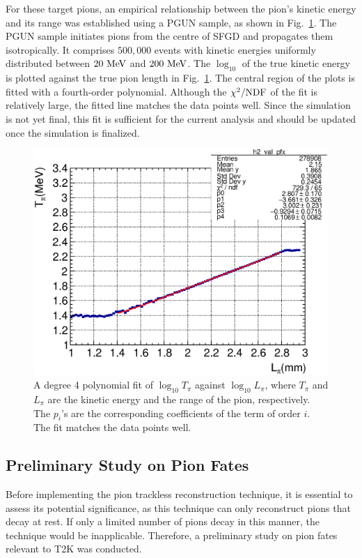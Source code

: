           For these target pions, an empirical relationship between the pion's kinetic energy and its range was established using a PGUN sample, as shown in Fig.~\ref{fig:pi-mombr-fit}. 
          The PGUN sample initiates pions from the centre of SFGD and propagates them isotropically. 
          It comprises $500,000$ events with kinetic energies uniformly distributed between $20~\textrm{MeV}$ and $200~\textrm{MeV}$. 
          The $\log_{10}$ of the true kinetic energy is plotted against the true pion length in Fig.~\ref{fig:pi-mombr-fit}.
          The central region of the plots is fitted with a fourth-order polynomial.
          Although the $\chi^2/{\textrm{NDF}}$ of the fit is relatively large, the fitted line matches the data points well.
          Since the simulation is not yet final, this fit is sufficient for the current analysis and should be updated once the simulation is finalized.
          \begin{figure}[ht]
          \centering
          \includegraphics[width=\sgfidwid\textwidth]{figures/sel/pi_len_pi_len_vs_pi_ke_hist2d_al0_true_nokink.eps} 
          \caption{A degree 4 polynomial fit of $\log_{10}{T_\pi}$ against $\log_{10}{L_\pi}$, where $T_\pi$ and $L_\pi$ are the kinetic energy and the range of the pion, respectively. The $p_i$'s are the corresponding coefficients of the term of order $i$. The fit matches the data points well.}
          \label{fig:pi-mombr-fit}
          \end{figure}

       \subsection{Preliminary Study on Pion Fates}
       \label{sec:tl-ps}
          Before implementing the pion trackless reconstruction technique, it is essential to assess its potential significance, as this technique can only reconstruct pions that decay at rest. 
          If only a limited number of pions decay in this manner, the technique would be inapplicable. 
          Therefore, a preliminary study on pion fates relevant to T2K was conducted.

